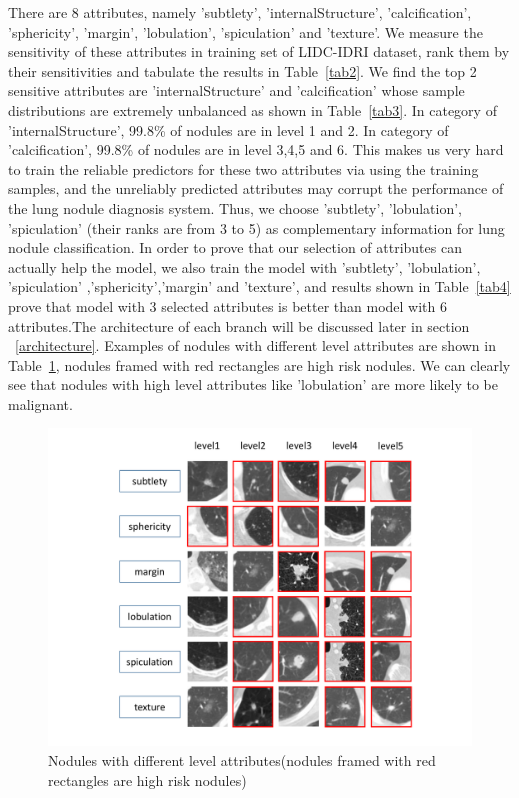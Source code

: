 \documentclass[runningheads]{llncs}
\begin{document}
There are 8 attributes, namely 'subtlety', 'internalStructure', 'calcification', 'sphericity', 'margin', 'lobulation', 'spiculation' and 'texture'.
We measure the sensitivity of these attributes in training set of LIDC-IDRI dataset, rank them by their sensitivities and tabulate the results in Table~\ref{tab2}. We find the top 2 sensitive attributes are 'internalStructure' and 'calcification' whose sample distributions are extremely unbalanced as shown in Table~\ref{tab3}.  In category of 'internalStructure', 99.8\% of nodules are in level 1 and 2. In category of 'calcification', 99.8\% of nodules are in level 3,4,5 and 6. This makes us very hard to train the reliable predictors for these two attributes via using the training samples, and the unreliably predicted attributes may corrupt the performance of the lung nodule diagnosis system. Thus, we choose 'subtlety', 'lobulation', 'spiculation' (their ranks are from 3 to 5) as complementary information for lung nodule classification. In order to prove that our selection of attributes can actually help the model, we also train the model with  'subtlety', 'lobulation', 'spiculation' ,'sphericity','margin' and 'texture',  and results shown in Table~\ref{tab4} prove that model with 3 selected attributes is better than model with 6 attributes.The architecture of each branch will be discussed later in section ~\ref{architecture}.
Examples of nodules with different level attributes are shown in Table~\ref{nodules}, nodules framed with red rectangles are high risk nodules. We can clearly see that nodules with high level attributes like 'lobulation' are more likely to be malignant.

\begin{figure}[htb]
\centerline{\includegraphics[width=125mm]{nodules.pdf}}
\vspace{-0.5cm}
\caption{Nodules with different level attributes(nodules framed with red rectangles are high risk nodules)}
\vspace{-0.5cm}
\label{nodules}
\end{figure}
\end{document}
